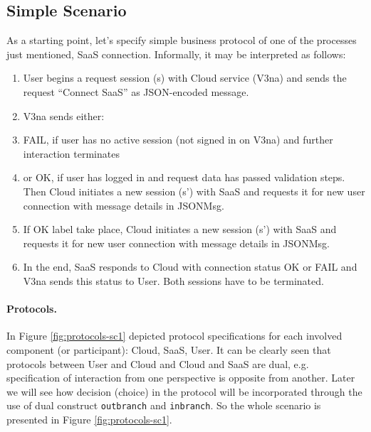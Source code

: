 \documentclass{llncs}
\begin{document}
\subsection{Simple Scenario}
As a starting point, let's specify simple business protocol of one of the processes just mentioned, SaaS connection. Informally, it may be interpreted as follows:
\begin{enumerate}
\item  User begins a request session (s) with Cloud service (V3na) and sends the request ``Connect SaaS'' as JSON-encoded message.

\item  V3na sends either:

\item  FAIL, if user has no active session (not signed in on V3na) and further interaction terminates 

\item  or OK, if user has logged in and request data has passed validation steps. Then Cloud initiates a new session (s') with SaaS and requests it for new user connection with message details in JSONMsg.

\item  If OK label take place, Cloud initiates a new session (s') with SaaS and requests it for new user connection with message details in JSONMsg.
\item In the end, SaaS responds to Cloud with connection status OK or FAIL and V3na sends this status to User. Both sessions have to be terminated.
\end{enumerate}

\paragraph{Protocols.} In Figure \ref{fig:protocols-sc1} depicted protocol specifications for each involved component (or participant): Cloud, SaaS, User. It can be clearly seen that protocols between User and Cloud and Cloud and SaaS are dual, e.g. specification of interaction from one perspective is opposite from another. Later we will see how decision (choice) in the protocol will be incorporated through the use of dual construct \texttt{outbranch} and \texttt{inbranch}. So the whole scenario is presented in Figure \ref{fig:protocols-sc1}.
\end{document}
